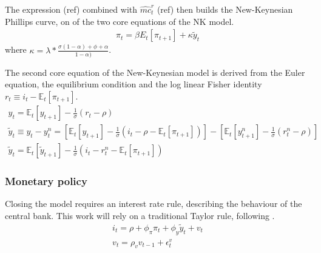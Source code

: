 \documentclass[12pt,a4paper,english]{article} %
\newcommand{\E}{\mathbb{E}} %
\begin{document}
	The expression (ref) combined with $\hat{mc}_t^r$ (ref) then builds the New-Keynesian Phillips curve, on of the two core equations of the NK model.
	\begin{equation}
		\begin{aligned}
			\pi_t = \beta E_t [\pi_{t+1}] + \kappa \tilde{y}_t
		\end{aligned}
	\end{equation}
	where $\kappa = \lambda * \frac{\sigma (1 - \alpha) + \phi + \alpha}
	{1 - \alpha)}$.
	
	The second core equation of the New-Keynesian model is derived from the Euler equation, the equilibrium condition and the log linear Fisher identity $r_t \equiv i_t - \E_t[\pi_{t+1}]$.
	\begin{equation}
		\begin{aligned}
			y_t = \E_t[y_{t+1}] - \frac{1}{\sigma} (r_t - \rho) \\
			\tilde{y}_t \equiv y_t - y_t^n = 
			\left[
			\E_t[y_{t+1}] - \frac{1}{\sigma} (i_t - \rho - \E_t[\pi_{t+1}])
			\right]
			-
			\left[
			\E_t[y_{t+1}^n] - \frac{1}{\sigma} (r_t^n - \rho)
			\right]\\
			\tilde{y}_t = \E_t[\tilde{y}_{t+1}] - \frac{1}{\sigma} (i_t - r_t^n - \E_t[\pi_{t+1}])
		\end{aligned}
	\end{equation}
	
	\subsubsection{Monetary policy}
	
	Closing the model requires an interest rate rule, describing the behaviour of the central bank. This work will rely on a traditional Taylor rule, following \cite{gali_monetary_2008}.
	\begin{equation}
		\begin{aligned}
			i_t = \rho + \phi_{\pi} \pi_t + \phi_{y} \tilde{y}_t + v_t \\
			v_t = \rho_v v_{t-1} + \epsilon_t^v
		\end{aligned}
	\end{equation}
\end{document}
